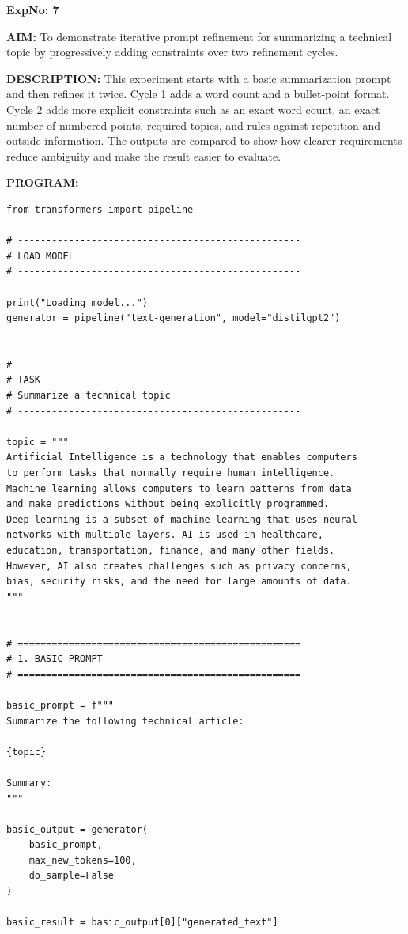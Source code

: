 \documentclass[10pt,a4paper]{article}
\newcommand{\sectionlabel}[1]{\par\vspace{3pt}\noindent\textbf{#1}\par\nopagebreak}
\begin{document}
\clearpage

\noindent\textbf{ExpNo: 7}

\noindent\textbf{AIM:} To demonstrate iterative prompt refinement for summarizing a technical topic by progressively adding constraints over two refinement cycles.

\noindent\textbf{DESCRIPTION:} This experiment starts with a basic summarization prompt and then refines it twice. Cycle 1 adds a word count and a bullet-point format. Cycle 2 adds more explicit constraints such as an exact word count, an exact number of numbered points, required topics, and rules against repetition and outside information. The outputs are compared to show how clearer requirements reduce ambiguity and make the result easier to evaluate.

\sectionlabel{PROGRAM:}
\begin{lstlisting}[style=code]
from transformers import pipeline

# --------------------------------------------------
# LOAD MODEL
# --------------------------------------------------

print("Loading model...")
generator = pipeline("text-generation", model="distilgpt2")


# --------------------------------------------------
# TASK
# Summarize a technical topic
# --------------------------------------------------

topic = """
Artificial Intelligence is a technology that enables computers
to perform tasks that normally require human intelligence.
Machine learning allows computers to learn patterns from data
and make predictions without being explicitly programmed.
Deep learning is a subset of machine learning that uses neural
networks with multiple layers. AI is used in healthcare,
education, transportation, finance, and many other fields.
However, AI also creates challenges such as privacy concerns,
bias, security risks, and the need for large amounts of data.
"""


# ==================================================
# 1. BASIC PROMPT
# ==================================================

basic_prompt = f"""
Summarize the following technical article:

{topic}

Summary:
"""

basic_output = generator(
    basic_prompt,
    max_new_tokens=100,
    do_sample=False
)

basic_result = basic_output[0]["generated_text"]



\end{lstlisting}
\end{document}
